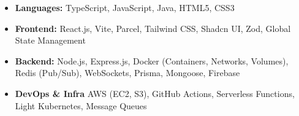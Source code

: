 \documentclass[11pt,letterpaper]{article}
\begin{document}
\vspace{0.5em}
\begin{itemize}[leftmargin=*,nosep]
  \item \textbf{Languages:}  TypeScript, JavaScript, Java, HTML5, CSS3
  \item \textbf{Frontend:} React.js, Vite, Parcel, Tailwind CSS, Shadcn UI, Zod, Global State Management
  \item \textbf{Backend:} Node.js, Express.js, Docker (Containers, Networks, Volumes), Redis (Pub/Sub), WebSockets, Prisma, Mongoose, Firebase
  \item \textbf{DevOps & Infra} AWS (EC2, S3), GitHub Actions, Serverless Functions, Light Kubernetes, Message Queues
\end{itemize}
\end{document}
